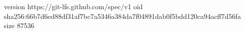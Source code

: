 version https://git-lfs.github.com/spec/v1
oid sha256:66b7d6ed88df31af7bc7a5346a384da7f04891dab0f5bdd120ca94acff7d56fa
size 87536
